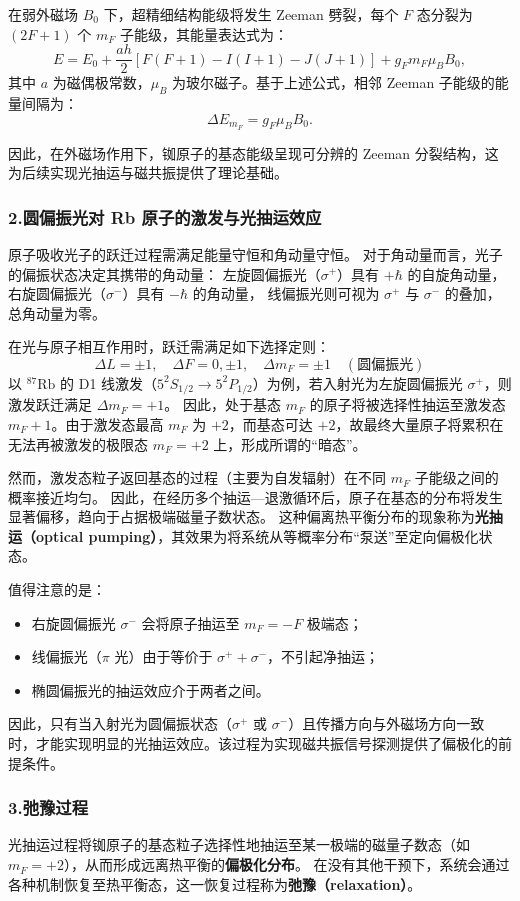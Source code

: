 \documentclass[12pt,a4paper,UTF8]{ctexart}
\begin{document}
在弱外磁场 $B_0$ 下，超精细结构能级将发生 Zeeman 劈裂，每个 $F$ 态分裂为 $(2F+1)$ 个 $m_F$ 子能级，其能量表达式为：
\[
E = E_0 + \frac{ah}{2}\left[ F(F+1) - I(I+1) - J(J+1) \right] + g_F m_F \mu_B B_0,
\]
其中 $a$ 为磁偶极常数，$\mu_B$ 为玻尔磁子。基于上述公式，相邻 Zeeman 子能级的能量间隔为：
\[
\Delta E_{m_F} = g_F \mu_B B_0.
\]

因此，在外磁场作用下，铷原子的基态能级呈现可分辨的 Zeeman 分裂结构，这为后续实现光抽运与磁共振提供了理论基础。

\subsubsection*{2.圆偏振光对 Rb 原子的激发与光抽运效应}
原子吸收光子的跃迁过程需满足能量守恒和角动量守恒。
对于角动量而言，光子的偏振状态决定其携带的角动量：
左旋圆偏振光（$\sigma^+$）具有 $+\hbar$ 的自旋角动量，右旋圆偏振光（$\sigma^-$）具有 $-\hbar$ 的角动量，
线偏振光则可视为 $\sigma^+$ 与 $\sigma^-$ 的叠加，总角动量为零。

在光与原子相互作用时，跃迁需满足如下选择定则：
\[
\Delta L = \pm 1, \quad \Delta F = 0, \pm 1, \quad \Delta m_F = \pm 1 \quad (\text{圆偏振光})
\]
以 $^{87}\mathrm{Rb}$ 的 D1 线激发（$5^2S_{1/2} \rightarrow 5^2P_{1/2}$）为例，若入射光为左旋圆偏振光 $\sigma^+$，则激发跃迁满足 $\Delta m_F = +1$。
因此，处于基态 $m_F$ 的原子将被选择性抽运至激发态 $m_F + 1$。由于激发态最高 $m_F$ 为 $+2$，而基态可达 $+2$，故最终大量原子将累积在无法再被激发的极限态 $m_F = +2$ 上，形成所谓的“暗态”。

然而，激发态粒子返回基态的过程（主要为自发辐射）在不同 $m_F$ 子能级之间的概率接近均匀。
因此，在经历多个抽运—退激循环后，原子在基态的分布将发生显著偏移，趋向于占据极端磁量子数状态。
这种偏离热平衡分布的现象称为\textbf{光抽运（optical pumping）}，其效果为将系统从等概率分布“泵送”至定向偏极化状态。

值得注意的是：
\begin{itemize}
  \item 右旋圆偏振光 $\sigma^-$ 会将原子抽运至 $m_F = -F$ 极端态；
  \item 线偏振光（$\pi$ 光）由于等价于 $\sigma^+ + \sigma^-$，不引起净抽运；
  \item 椭圆偏振光的抽运效应介于两者之间。
\end{itemize}

因此，只有当入射光为圆偏振状态（$\sigma^+$ 或 $\sigma^-$）且传播方向与外磁场方向一致时，才能实现明显的光抽运效应。该过程为实现磁共振信号探测提供了偏极化的前提条件。

\subsubsection*{3.弛豫过程}
光抽运过程将铷原子的基态粒子选择性地抽运至某一极端的磁量子数态（如 $m_F = +2$），从而形成远离热平衡的\textbf{偏极化分布}。
在没有其他干预下，系统会通过各种机制恢复至热平衡态，这一恢复过程称为\textbf{弛豫（relaxation）}。
\end{document}
